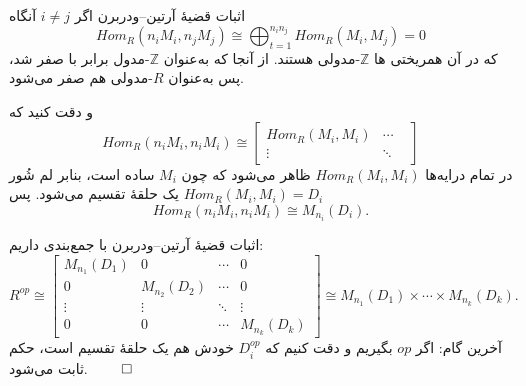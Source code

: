 \begin{frame}{اثبات قضیهٔ آرتین–ودربرن}
    \normalsize
    اگر $i \neq j$ آنگاه
    \[
        Hom_R(n_i M_i , n_j M_j) \cong \bigoplus_{t=1}^{n_i n_j} Hom_R(M_i , M_j) = 0
    \]
    که در آن همریختی ها
    \(\mathbb{Z}\)-مدولی
    هستند. از آنجا که به‌عنوان
    \(\mathbb{Z}\)-مدول
    برابر با صفر شد، پس به‌عنوان
    \(R\)-مدولی
    هم صفر ‌می‌شود.

    و دقت کنید که
    \[
        Hom_R(n_i M_i , n_i M_i)
        \cong
        \begin{bmatrix}
            Hom_R( M_i ,  M_i) & \cdots & \\
            \vdots             & \ddots &
        \end{bmatrix}
    \]
    در تمام درایه‌ها $Hom_R(M_i, M_i)$ ظاهر می‌شود که چون $M_i$ ساده است، بنابر لم شُور $Hom_R(M_i, M_i) = D_i$ یک حلقهٔ تقسیم می‌شود. پس
    \[
        Hom_R(n_i M_i , n_i M_i) \cong M_{n_i}(D_i).
    \]

\end{frame}

\begin{frame}{اثبات قضیهٔ آرتین–ودربرن}
    \normalsize
    با جمع‌بندی داریم:
    \bigskip
    \[
        R^{op}
        \cong
        \begin{bmatrix}
            M_{n_1}(D_1) & 0            & \cdots & 0            \\
            0            & M_{n_2}(D_2) & \cdots & 0            \\
            \vdots       & \vdots       & \ddots & \vdots       \\
            0            & 0            & \cdots & M_{n_k}(D_k)
        \end{bmatrix}
        \cong M_{n_1}(D_1) \times \cdots \times M_{n_k}(D_k).
    \]
    \bigskip
    آخرین گام: اگر $op$ بگیریم و دقت کنیم که $D_i^{op}$ خودش هم یک حلقهٔ تقسیم است، حکم ثابت می‌شود.
    \hfill\(\qed\)
\end{frame}